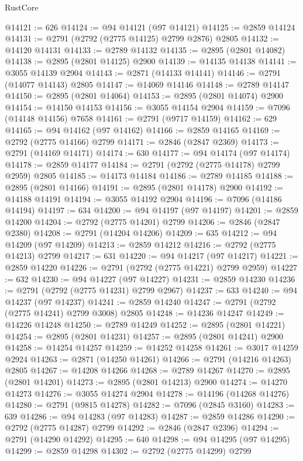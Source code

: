\begin{lexlean}{RustCore}
\begin{coremodule}
@14121 := 626
@14124 := @94 @14121 (@97 @14121)
@14125 := @2859 @14124
@14131 := @2791 (@2792 (@2775 @14125) @2799 @2876) @2805
@14132 := @14120 @14131
@14133 := @2789 @14132
@14135 := @2895 (@2801 @14082)
@14138 := @2895 (@2801 @14125) @2900
@14139 := @14135 @14138
@14141 := @3055 @14139 @2904
@14143 := @2871 (@14133 @14141)
@14146 := @2791 (@14077 @14143) @2805
@14147 := @14069 @14146
@14148 := @2789 @14147
@14150 := @2895 (@2801 @14064)
@14153 := @2895 (@2801 @14074) @2900
@14154 := @14150 @14153
@14156 := @3055 @14154 @2904
@14159 := @7096 (@14148 @14156) @7658
@14161 := @2791 (@9717 @14159)
@14162 := 629
@14165 := @94 @14162 (@97 @14162)
@14166 := @2859 @14165
@14169 := @2792 (@2775 @14166) @2799
@14171 := @2846 (@2847 @2369)
@14173 := @2791 (@14169 @14171)
@14174 := 630
@14177 := @94 @14174 (@97 @14174)
@14178 := @2859 @14177
@14184 := @2791 (@2792 (@2775 @14178) @2799 @2959) @2805
@14185 := @14173 @14184
@14186 := @2789 @14185
@14188 := @2895 (@2801 @14166)
@14191 := @2895 (@2801 @14178) @2900
@14192 := @14188 @14191
@14194 := @3055 @14192 @2904
@14196 := @7096 (@14186 @14194)
@14197 := 634
@14200 := @94 @14197 (@97 @14197)
@14201 := @2859 @14200
@14204 := @2792 (@2775 @14201) @2799
@14206 := @2846 (@2847 @2380)
@14208 := @2791 (@14204 @14206)
@14209 := 635
@14212 := @94 @14209 (@97 @14209)
@14213 := @2859 @14212
@14216 := @2792 (@2775 @14213) @2799
@14217 := 631
@14220 := @94 @14217 (@97 @14217)
@14221 := @2859 @14220
@14226 := @2791 (@2792 (@2775 @14221) @2799 @2959)
@14227 := 632
@14230 := @94 @14227 (@97 @14227)
@14231 := @2859 @14230
@14236 := @2791 (@2792 (@2775 @14231) @2799 @2967)
@14237 := 633
@14240 := @94 @14237 (@97 @14237)
@14241 := @2859 @14240
@14247 := @2791 (@2792 (@2775 @14241) @2799 @3008) @2805
@14248 := @14236 @14247
@14249 := @14226 @14248
@14250 := @2789 @14249
@14252 := @2895 (@2801 @14221)
@14254 := @2895 (@2801 @14231)
@14257 := @2895 (@2801 @14241) @2900
@14258 := @14254 @14257
@14259 := @14252 @14258
@14261 := @3017 @14259 @2924
@14263 := @2871 (@14250 @14261)
@14266 := @2791 (@14216 @14263) @2805
@14267 := @14208 @14266
@14268 := @2789 @14267
@14270 := @2895 (@2801 @14201)
@14273 := @2895 (@2801 @14213) @2900
@14274 := @14270 @14273
@14276 := @3055 @14274 @2904
@14278 := @14196 (@14268 @14276)
@14280 := @2791 (@9815 @14278)
@14282 := @7096 (@2845 @3160)
@14283 := 639
@14286 := @94 @14283 (@97 @14283)
@14287 := @2859 @14286
@14290 := @2792 (@2775 @14287) @2799
@14292 := @2846 (@2847 @2396)
@14294 := @2791 (@14290 @14292)
@14295 := 640
@14298 := @94 @14295 (@97 @14295)
@14299 := @2859 @14298
@14302 := @2792 (@2775 @14299) @2799

\end{coremodule}
\end{lexlean}
